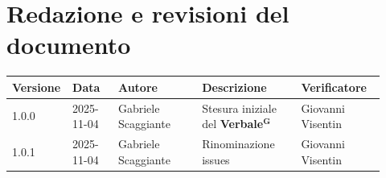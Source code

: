\documentclass[a4paper,12pt]{article}
\newcommand{\term}[1]{\textbf{#1}$^\mathbf{G}$}
\begin{document}
\clearpage
\section{Redazione e revisioni del documento}

\begin{center}
\small
\renewcommand{\arraystretch}{1.2} 
\begin{tabular}{|p{0.1\linewidth}|p{0.12\linewidth}|p{0.22\linewidth}|p{0.26\linewidth}|p{0.22\linewidth}|}
\hline
\rowcolor{gray!60} 
\textbf{Versione} & \textbf{Data} & \textbf{Autore} & \textbf{Descrizione} & \textbf{Verificatore} \\
\hline
\rowcolor{white}
1.0.0 & 2025-11-04 & Gabriele Scaggiante & Stesura iniziale del \term{Verbale} & Giovanni Visentin \\
\hline
\rowcolor{gray!20}
1.0.1 & 2025-11-04 & Gabriele Scaggiante & Rinominazione issues & Giovanni Visentin \\
\hline

\end{tabular}
\end{center}
\end{document}
